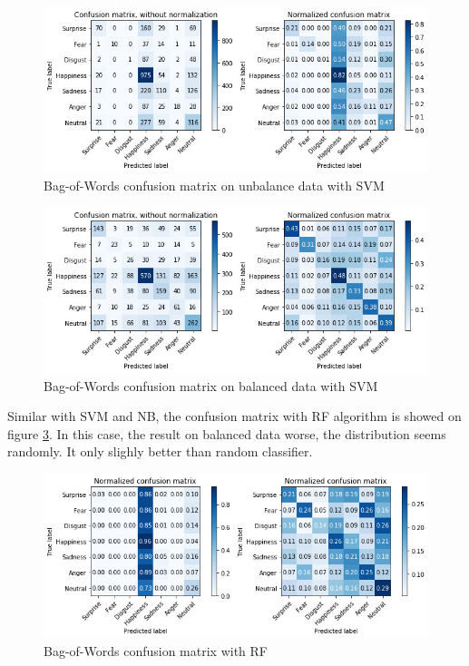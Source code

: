 \documentclass[12pt]{article}
\begin{document}
\begin{figure} [h!]
    \centering
    \includegraphics[width=\textwidth]{imgs/n-bow-svm.jpg}
    \caption{Bag-of-Words confusion matrix on unbalance data with SVM}
    \label{fig:normal-bow-svm}
\end{figure}

\begin{figure} [h!]
    \centering
    \includegraphics[width=\textwidth]{imgs/upsample-bow-svm.jpg}
    \caption{Bag-of-Words confusion matrix on balanced data with SVM}
    \label{fig:upsample-bow-svm}
\end{figure}

Similar with SVM and NB, the confusion matrix with RF algorithm is showed on figure \ref{fig:bow-rf}.
In this case, the result on balanced data worse, the distribution seems randomly.
It only slighly better than random classifier.

\begin{figure} [h!]
    \centering
    \includegraphics[width=\textwidth]{imgs/bow-rf.jpg}
    \caption{Bag-of-Words confusion matrix with RF}
    \label{fig:bow-rf}
\end{figure}
       
\end{document}
